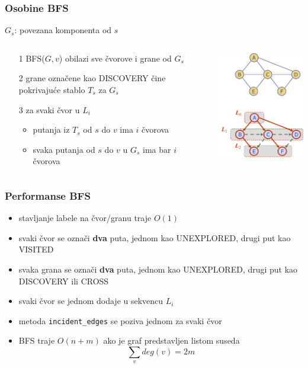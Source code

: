 \documentclass[compress]{beamer}
\begin{document}
\begin{frame}[fragile]
  \frametitle{Osobine BFS}
  $G_{s}$: povezana komponenta od $s$
  \begin{columns}
    \begin{column}[t]{6cm}
      \begin{itemize}
        \item[1] BFS($G,v$) obilazi sve čvorove i grane od $G_{s}$
        \item[2] grane označene kao {\scriptsize DISCOVERY} čine 
          pokrivajuće stablo $T_{s}$ za $G_{s}$
        \item[3] za svaki čvor u $L_{i}$
        \begin{itemize}
          \item putanja iz $T_{s}$ od $s$ do $v$ ima $i$ čvorova
          \item svaka putanja od $s$ do $v$ u $G_{s}$ ima bar $i$ čvorova
        \end{itemize}
      \end{itemize}
    \end{column}
    \begin{column}[t]{6cm}
      \begin{center}
        \includegraphics[width=5cm]{asp-14-pic25.png}
      \end{center}
    \end{column}
  \end{columns}
\end{frame}

\begin{frame}[fragile]
  \frametitle{Performanse BFS}
  \begin{itemize}
    \item stavljanje labele na čvor/granu traje $O(1)$
    \item svaki čvor se označi \textbf{dva} puta, jednom kao {\scriptsize 
      UNEXPLORED}, drugi put kao {\scriptsize VISITED}
    \item svaka grana se označi \textbf{dva} puta, jednom kao {\scriptsize 
      UNEXPLORED}, drugi put kao {\scriptsize DISCOVERY} ili 
      {\scriptsize CROSS}
    \item svaki čvor se jednom dodaje u sekvencu $L_{i}$
    \item metoda \texttt{incident\_edges} se poziva jednom za svaki čvor
    \item BFS traje $O(n+m)$ ako je graf predstavljen listom suseda
    $$\sum_{v}deg(v)=2m$$
  \end{itemize}
\end{frame}
\end{document}
